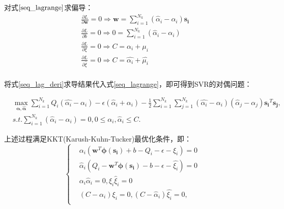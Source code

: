 对式$\eqref{seq_lagrange}$求偏导：
\begin{equation}\label{seq_lag_deri}
\begin{split}
&\frac{\partial{L}}{\partial{\bm{w}}}=0 \Rightarrow \bm{w} = \sum_{i=1}^{N_{k}}(\hat{\alpha}_{i}-\alpha_{i})\bm{s_{i}}
\\ 
&\frac{\partial{L}}{\partial{b}}=0 \Rightarrow 0 = \sum_{i=1}^{N_{k}}(\hat{\alpha}_{i}-\alpha_{i})
\\ 
&\frac{\partial{L}}{\partial{\xi}}=0 \Rightarrow  C = \alpha_{i} + \mu_{i}
\\ 
&\frac{\partial{L}}{\partial{\hat{\xi}}}=0 \Rightarrow  C = \hat{\alpha_{i}} + \hat{\mu_{i}}
\\
\end{split}
\end{equation}

将式\eqref{seq_lag_deri}求导结果代入式\eqref{seq_lagrange}，即可得到SVR的对偶问题：

\begin{equation}\label{seq_lagr_dual}
\begin{split}
&\max_{\bm{\alpha}, \bm{\hat{\alpha}}} \sum_{i=1}^{N_{k}} Q_{i}(\hat{\alpha_{i}} - \alpha_{i}) - \epsilon (\hat{\alpha}_{i} + \alpha_{i}) - \frac{1}{2} \sum_{i=1}^{N_{k}} \sum_{j=1}^{N_{k}}(\hat{\alpha_{i}}-\alpha_{i})(\hat{\alpha}_{j}-\alpha_{j})\bm{s_{i}}^{T}\bm{s_{j}},\\
&s.t. \sum_{i=1}^{N_{k}}(\hat{\alpha}_{i}-\alpha_{i})=0, 0 \leqslant \alpha_{i},\hat{\alpha}_{i} \leqslant C.
\end{split}
\end{equation}


上述过程满足KKT(Karush-Kuhn-Tucker)最优化条件，即：
\begin{equation}
\label{seq_kkt}
\left\{\begin{matrix}
&\alpha_{i}(\bm{w}^{T} \bm{\phi(s_{i})} + b - Q_{i} - \epsilon - \xi_{i})=0
\\ 
&\hat{\alpha}_{i}(Q_{i} - \bm{w}^{T} \bm{\phi(s_{i})} - b - \epsilon - \hat{\xi_{i}})=0
\\ 
&\alpha_{i}\hat{\alpha}_{i}=0, \xi_{i}\hat{\xi}_{i}=0
\\ 
&(C-\alpha_{i})\xi_{i}=0,(C-\hat{\alpha}_{i})\hat{\xi_{i}}=0,
\\
\end{matrix}\right.
\end{equation}

